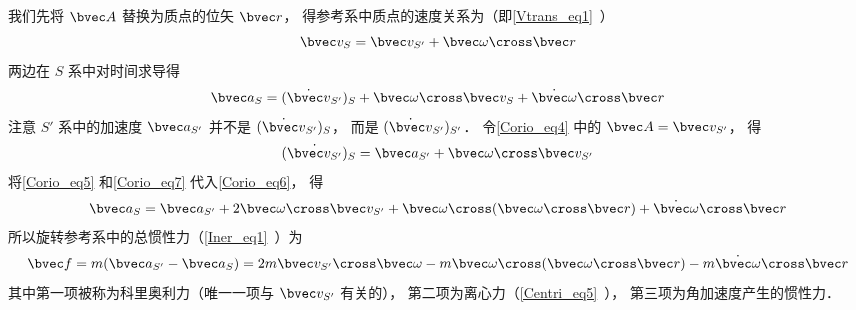 我们先将 $\bvec A$ 替换为质点的位矢 $\bvec r$， 得参考系中质点的速度关系为（即\autoref{Vtrans_eq1}~）
\begin{equation}\label{Corio_eq5}
\bvec v_{S} = \bvec v_{S'} + \bvec\omega\cross\bvec r
\end{equation}
两边在 $S$ 系中对时间求导得
\begin{equation}\label{Corio_eq6}
\bvec a_{S} = (\dot{\bvec v}_{S'})_{S} + \bvec\omega\cross\bvec v_{S} + \dot{\bvec\omega} \cross\bvec r
\end{equation}
注意 $S'$ 系中的加速度 $\bvec a_{S'}$ 并不是 $(\dot{\bvec v}_{S'})_{S}$， 而是 $(\dot{\bvec v}_{S'})_{S'}$． 令\autoref{Corio_eq4} 中的 $\bvec A = \bvec v_{S'}$， 得
\begin{equation}\label{Corio_eq7}
(\dot{\bvec v_{S'}})_{S} = \bvec a_{S'} + \bvec\omega\cross\bvec v_{S'}
\end{equation}
将\autoref{Corio_eq5} 和\autoref{Corio_eq7} 代入\autoref{Corio_eq6}， 得
\begin{equation}
\bvec a_{S} = \bvec a_{S'} + 2\bvec\omega\cross\bvec v_{S'} + \bvec\omega\cross(\bvec\omega\cross\bvec r) + \dot{\bvec\omega} \cross\bvec r
\end{equation}
所以旋转参考系中的总惯性力（\autoref{Iner_eq1}~）为
\begin{equation}\label{Corio_eq1}
\bvec f = m(\bvec a_{S'} - \bvec a_{S}) = 2m\bvec v_{S'}\cross \bvec\omega  -m\bvec\omega\cross(\bvec\omega\cross\bvec r) - m \dot{\bvec\omega} \cross\bvec r
\end{equation}
其中第一项被称为科里奥利力（唯一一项与 $\bvec v_{S'}$ 有关的）， 第二项为离心力（\autoref{Centri_eq5}~）， 第三项为角加速度产生的惯性力．
